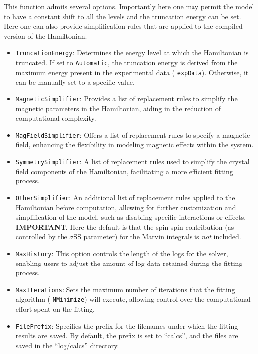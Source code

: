 \documentclass{article}
\newcommand{\codetext}[1]{{\color{BlueViolet} \texttt{#1}}}
\begin{document}
This function admits several options. Importantly here one may permit the model to have a constant shift to all the levels and the truncation energy can be set. Here one can also provide simplification rules that are applied to the compiled version of the Hamiltonian.

\begin{itemize}
	\item \codetext{TruncationEnergy}: Determines the energy level at which the Hamiltonian is truncated. If set to \codetext{Automatic}, the truncation energy is derived from the maximum energy present in the experimental data (\codetext{expData}). Otherwise, it can be manually set to a specific value.
	
	\item \codetext{MagneticSimplifier}: Provides a list of replacement rules to simplify the magnetic parameters in the Hamiltonian, aiding in the reduction of computational complexity.
	
	\item \codetext{MagFieldSimplifier}: Offers a list of replacement rules to specify a magnetic field, enhancing the flexibility in modeling magnetic effects within the system.
	
	\item \codetext{SymmetrySimplifier}: A list of replacement rules used to simplify the crystal field components of the Hamiltonian, facilitating a more efficient fitting process.
	
	\item \codetext{OtherSimplifier}: An additional list of replacement rules applied to the Hamiltonian before computation, allowing for further customization and simplification of the model, such as disabling specific interactions or effects. \textbf{IMPORTANT}. Here the default is that the spin-spin contribution (as controlled by the $\sigma$SS parameter) for the Marvin integrals is \textit{not} included.
	
	\item \codetext{MaxHistory}: This option controls the length of the logs for the solver, enabling users to adjust the amount of log data retained during the fitting process.
	
	\item \codetext{MaxIterations}: Sets the maximum number of iterations that the fitting algorithm (\codetext{NMinimize}) will execute, allowing control over the computational effort spent on the fitting.
	
	\item \codetext{FilePrefix}: Specifies the prefix for the filenames under which the fitting results are saved. By default, the prefix is set to ``calcs'', and the files are saved in the ``log/calcs'' directory.
	

\end{itemize}
\end{document}
